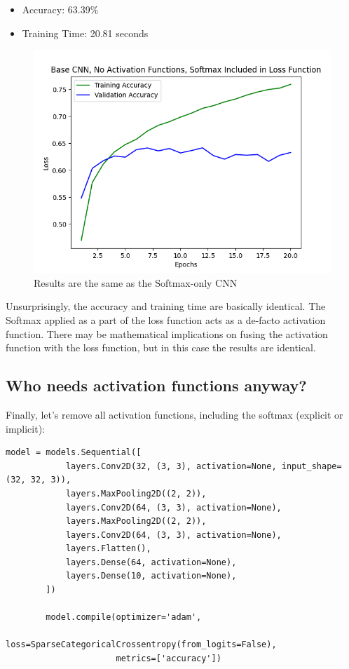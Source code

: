 \documentclass{article}
\begin{document}
    \begin{itemize}
        \item Accuracy: 63.39\%
        \item Training Time: 20.81 seconds
    \end{itemize}

    \begin{figure}[!htbp]
        \centerline{\includegraphics[width=0.55\columnwidth]{Base CNN, No Activation Functions, Softmax Included in Loss Function}}
        \caption{Results are the same as the Softmax-only CNN}
        \label{fig:sneaky-softmax}
    \end{figure}

    Unsurprisingly, the accuracy and training time are basically identical.
    The Softmax applied as a part of the loss function acts as a de-facto activation function.
    There may be mathematical implications on fusing the activation function with the loss function, but in this case the results are identical.

    \subsection{Who needs activation functions anyway?}\label{subsec:no-activation-functions-at-all}

    Finally, let's remove all activation functions, including the softmax (explicit or implicit):

    \begin{lstlisting}[label={lst:no_activations}]
        model = models.Sequential([
            layers.Conv2D(32, (3, 3), activation=None, input_shape=(32, 32, 3)),
            layers.MaxPooling2D((2, 2)),
            layers.Conv2D(64, (3, 3), activation=None),
            layers.MaxPooling2D((2, 2)),
            layers.Conv2D(64, (3, 3), activation=None),
            layers.Flatten(),
            layers.Dense(64, activation=None),
            layers.Dense(10, activation=None),
        ])

        model.compile(optimizer='adam',
                      loss=SparseCategoricalCrossentropy(from_logits=False),
                      metrics=['accuracy'])
    \end{lstlisting}
\end{document}
